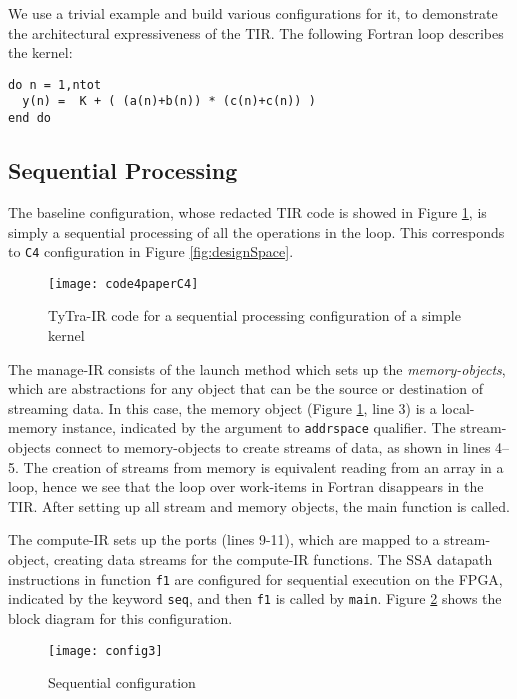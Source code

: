 \documentclass[]{heart2015_WN4Pre}
\begin{document}
We use a trivial example and build various configurations for it, to demonstrate the architectural expressiveness of the TIR. The following Fortran loop describes the kernel:
\begin{verbatim}
do n = 1,ntot
  y(n) =  K + ( (a(n)+b(n)) * (c(n)+c(n)) )                
end do 
\end{verbatim}

\subsection{Sequential Processing}
\label{sec:illustration-config1}

The baseline configuration, whose redacted TIR code is showed in Figure \ref{fig:code4paperC4}, is simply a sequential processing of all the operations in the loop. This corresponds to \texttt{C4} configuration in Figure \ref{fig:designSpace}.

\begin{figure}[tbh]
\centering
\texttt{[image: code4paperC4]}
\caption{TyTra-IR code for a sequential processing configuration of a simple kernel}
\label{fig:code4paperC4}
\end{figure}

The manage-IR consists of the launch method which sets up the \textit{memory-objects}, which are abstractions for any object that can be the source or destination of streaming data. In this case, the memory object (Figure \ref{fig:code4paperC4}, line 3) is a local-memory instance, indicated by the argument to \texttt{addrspace} qualifier. The stream-objects connect to memory-objects to create streams of data, as shown in lines 4--5. The creation of streams from memory is equivalent reading from an array in a loop, hence we see that the loop over work-items in Fortran disappears in the TIR. After setting up all stream and memory objects, the main function is called. 

The compute-IR sets up the ports (lines 9-11), which are mapped to a stream-object, creating data streams for the compute-IR functions. The SSA datapath instructions in function \texttt{f1} are configured for sequential execution on the FPGA, indicated by the keyword \texttt{seq}, and then \texttt{f1} is called by \texttt{main}. Figure \ref{fig:config3} shows the block diagram for this configuration.

\begin{figure}[th]
\centering
\texttt{[image: config3]}
\caption[]{Sequential configuration}
\label{fig:config3}
\end{figure}
\end{document}
